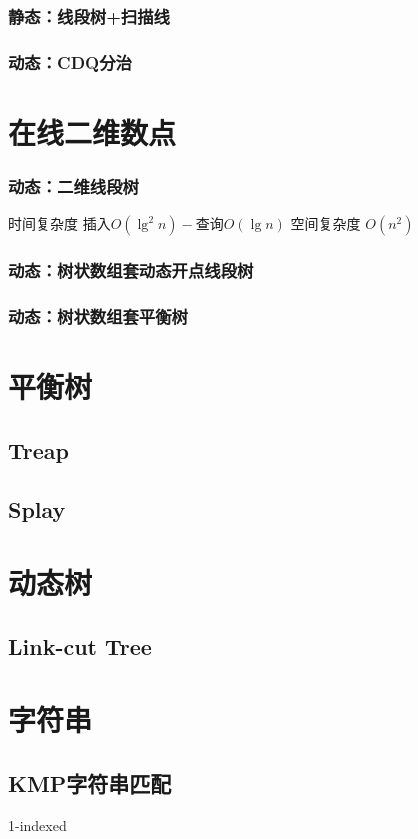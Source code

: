 \documentclass{article}
\begin{document}
			\subsubsection{静态：线段树+扫描线}
			\subsubsection{动态：CDQ分治}
	\section{在线二维数点}
		\subsubsection{动态：二维线段树}
		时间复杂度 $\text{插入} O(\lg^2 n) - \text{查询} O(\lg n)$
		空间复杂度 $O(n^2)$
		\subsubsection{动态：树状数组套动态开点线段树}
		\subsubsection{动态：树状数组套平衡树}
	\newpage

	\section{平衡树}
		\subsection{Treap}
		\subsection{Splay}

	\newpage

	\section{动态树}
		\subsection{Link-cut Tree}

	\newpage

	\section{字符串}
		\subsection{KMP字符串匹配}
		1-indexed
\end{document}

